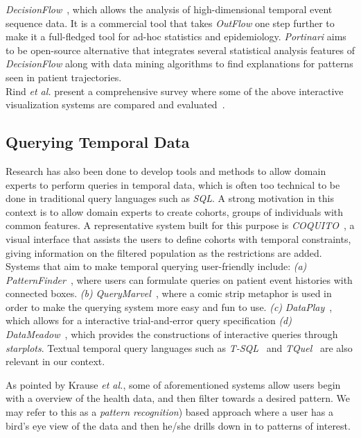\documentclass[10pt, conference]{IEEEtran}
\begin{document}
\noindent \textit{DecisionFlow}~\cite{DecisionFlow}, which allows the analysis of high-dimensional temporal event sequence data. It is a commercial tool that takes \textit{OutFlow} one step further to make it a full-fledged tool for ad-hoc statistics and epidemiology. \textit{Portinari} aims to be open-source alternative that integrates several statistical analysis features of \textit{DecisionFlow} along with data mining algorithms to find explanations for patterns seen in patient trajectories. \\
Rind \textit{et al.} present a comprehensive survey where some of the above interactive visualization systems are compared and evaluated~\cite{EhrVisSurvey}.



\subsection{Querying Temporal Data}
Research has also been done to develop tools and methods to allow domain experts to perform queries in temporal data, which is often too technical to be done in traditional query languages such as \textit{SQL}\cite{COQUITO}. 
A strong motivation in this context is to allow domain experts to create cohorts, groups of individuals with common features.
A representative system built for this purpose is \textit{COQUITO}~\cite{COQUITO}, a visual interface that assists the users to define cohorts with temporal constraints, giving information on the filtered population as the restrictions are added.
Systems that aim to make temporal querying  user-friendly include: 
\textit{(a)} \textit{PatternFinder}~\cite{PatternFinder}, where users can formulate queries on patient event histories with connected boxes. 
\textit{(b)} \textit{QueryMarvel}~\cite{QueryMarvel}, where a comic strip metaphor is used in order to make the querying system more easy and fun to use. 
\textit{(c)} \textit{DataPlay}~\cite{DataPlay}, which allows for a interactive trial-and-error query specification 
\textit{(d)} \emph{DataMeadow}~\cite{DataMeadow}, which provides the constructions of interactive queries through \emph{starplots}. Textual temporal query languages such as \textit{T-SQL}~\cite{TSQL} and \textit{TQuel}~\cite{TQUEL} are also relevant in our context.

As pointed by Krause \textit{et al.}\cite{COQUITO}, some of aforementioned systems allow users begin with a overview of the health data, and then filter towards a desired pattern. We may refer to this as a \textit{pattern recognition}) based approach where a user has a bird's eye view of the data and then he/she drills down in to patterns of interest.
\end{document}
